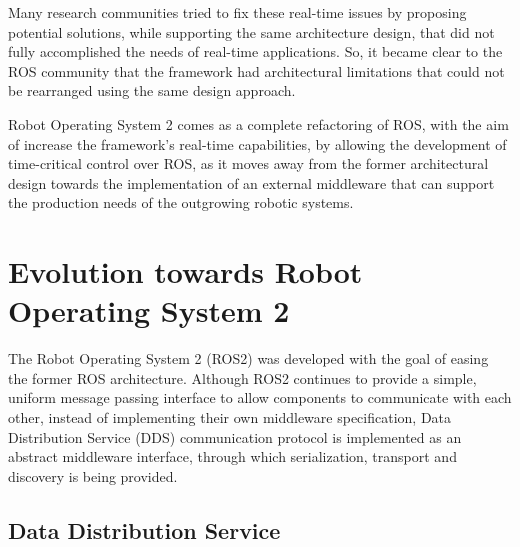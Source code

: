 Many research communities tried to fix these real-time issues by proposing potential solutions, while supporting the same architecture design, that did not fully accomplished the needs of real-time applications. So, it became clear to the ROS community that the framework had architectural limitations that could not be rearranged using the same design approach. \cite{maruyama2016exploring}

Robot Operating System 2 comes as a complete refactoring of ROS, with the aim of increase the framework's real-time capabilities, by allowing the development of time-critical control over ROS, as it moves away from the former architectural design towards the implementation of an external middleware that can support the production needs of the outgrowing robotic systems. \cite{kim2018security, casini2019response}


\section{Evolution towards Robot Operating System 2}

The Robot Operating System 2 (ROS2) was developed with the goal of easing the former ROS architecture. Although ROS2 continues to provide a simple, uniform message passing interface to allow components to communicate with each other, instead of implementing their own middleware specification, Data Distribution Service (DDS) communication protocol is implemented as an abstract middleware interface, through which serialization, transport and discovery is being provided. %

\subsection{Data Distribution Service}

